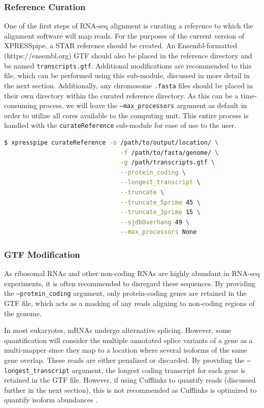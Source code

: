 \documentclass[11pt, a4paper, oneside]{article}
\begin{document}
\subsubsection{Reference Curation}
One of the first steps of RNA-seq alignment is curating a reference to which the alignment software will map reads. For the purposes of the current version of XPRESSpipe, a STAR \cite{star} reference should be created. An Ensembl-formatted (https://ensembl.org) GTF should also be placed in the reference directory and be named \texttt{transcripts.gtf}. Additional modifications are recommended to this file, which can be performed using this sub-module, discussed in more detail in the next section. Additionally, any chromosome \texttt{.fasta} files should be placed in their own directory within the curated reference directory. As this can be a time-consuming process, we will leave the \texttt{--max\_processors} argument as default in order to utilize all cores available to the computing unit. This entire process is handled with the \texttt{curateReference} sub-module for ease of use to the user.
\newline
\begin{lstlisting}[language=bash, caption=curateReference example]
$ xpresspipe curateReference -o /path/to/output/location/ \
                                -f /path/to/fasta/genome/ \
                                -g /path/transcripts.gtf \
                                --protein_coding \
                                --longest_transcript \
                                --truncate \
                                --truncate_5prime 45 \
                                --truncate_3prime 15 \
                                --sjdbOverhang 49 \
                                --max_processors None
\end{lstlisting}


\subsubsection{GTF Modification}
As ribosomal RNAs and other non-coding RNAs are highly abundant in RNA-seq experiments, it is often recommended to disregard these sequences. By providing the \texttt{--protein\_coding} argument, only protein-coding genes are retained in the GTF file, which acts as a masking of any reads aligning to non-coding regions of the genome. \par

In most eukaryotes, mRNAs undergo alternative splicing. However, some quantification will consider the multiple annotated splice variants of a gene as a multi-mapper since they map to a location where several isoforms of the same gene overlap. These reads are either penalized or discarded. By providing the \texttt{--longest\_transcript} argument, the longest coding transcript for each gene is retained in the GTF file. However, if using Cufflinks to quantify reads (discussed further in the next section), this is not recommended as Cufflinks is optimized to quantify isoform abundances \cite{cufflinks}. \par
\end{document}
